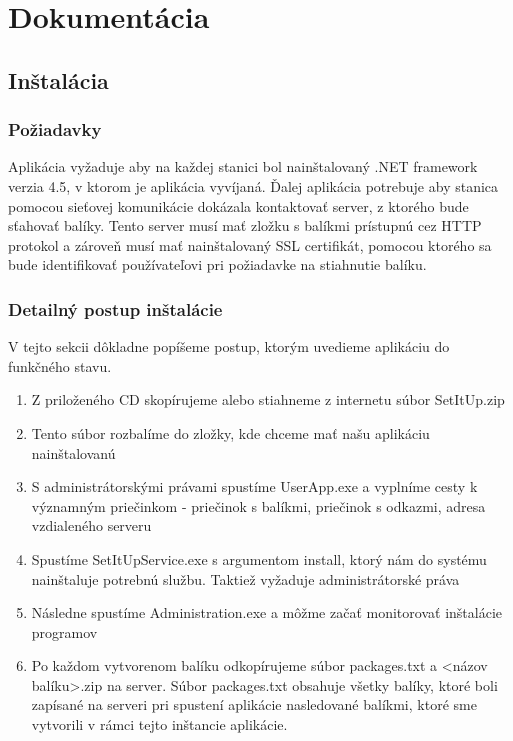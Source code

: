 \chapter{Dokumentácia}

\section{Inštalácia}
\subsection{Požiadavky}
Aplikácia vyžaduje aby na každej stanici bol nainštalovaný .NET framework verzia 4.5, v ktorom je aplikácia vyvíjaná. Ďalej aplikácia potrebuje aby stanica pomocou sieťovej komunikácie dokázala kontaktovať server, z ktorého bude sťahovať balíky. Tento server musí mať zložku s balíkmi prístupnú cez HTTP protokol a zároveň musí mať nainštalovaný SSL certifikát, pomocou ktorého sa bude identifikovať používateľovi pri požiadavke na stiahnutie balíku.

\subsection{Detailný postup inštalácie}
V tejto sekcii dôkladne popíšeme postup, ktorým uvedieme aplikáciu do funkčného stavu.
\begin{enumerate}
\item Z priloženého CD skopírujeme alebo stiahneme z internetu súbor SetItUp.zip
\item Tento súbor rozbalíme do zložky, kde chceme mať našu aplikáciu nainštalovanú
\item S administrátorskými právami spustíme UserApp.exe a vyplníme cesty k významným priečinkom - priečinok s balíkmi, priečinok s odkazmi, adresa vzdialeného serveru
\item Spustíme SetItUpService.exe s argumentom install, ktorý nám do systému nainštaluje potrebnú službu. Taktiež vyžaduje administrátorské práva
\item Následne spustíme Administration.exe a môžme začať monitorovať inštalácie programov
\item Po každom vytvorenom balíku odkopírujeme súbor packages.txt a \textless názov balíku\textgreater.zip na server. Súbor packages.txt obsahuje všetky balíky, ktoré boli zapísané na serveri pri spustení aplikácie nasledované balíkmi, ktoré sme vytvorili v rámci tejto inštancie aplikácie.
\end{enumerate}

